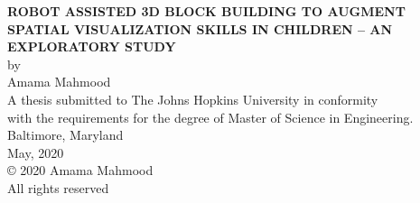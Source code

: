 \thispagestyle{empty}
\baselineskip=18pt
\begin{center}
\vspace*{3\baselineskip}
%
{\bfseries ROBOT ASSISTED 3D BLOCK BUILDING TO AUGMENT SPATIAL VISUALIZATION SKILLS IN CHILDREN – AN EXPLORATORY STUDY }\\[6\baselineskip]
%
by\\
%
Amama Mahmood\\[3\baselineskip]
%
%
A thesis submitted to The Johns Hopkins University in conformity\\
with the requirements for the degree of Master of Science in Engineering.\\[4\baselineskip]
%
Baltimore, Maryland\\
May, 2020\\[6\baselineskip]
%
{\copyright{} 2020 Amama Mahmood\\
All rights reserved}
%
\end{center}
%
\baselineskip=24pt
\newpage 
